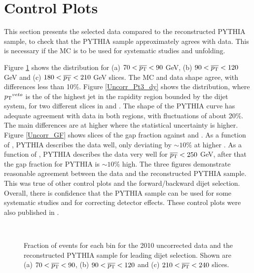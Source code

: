 \section{Control Plots}
\label{sec:GBJ1:Uncorr}
This section presents the selected data compared to the reconstructed PYTHIA sample, to check that the PYTHIA sample approximately agrees with data.
This is necessary if the MC is to be used for systematic studies and unfolding.


Figure \ref{UncorrIncl_dy} shows the \Incl{} distribution for (a) $70<\mbox{$\overline{p_{\rm T}}$}{}<90$ GeV, (b) $90<\mbox{$\overline{p_{\rm T}}$}{}<120$ GeV and (c) $180<\mbox{$\overline{p_{\rm T}}$}{}<210$ GeV slices. 
The MC and data shape agree, with differences less than 10\%.
Figure \ref{Uncorr_Pt3_dy} shows the \ptDist{} distribution, where $\mbox{$p_{\rm T}$}{}^{veto}$ is the \pt{} of the highest jet in the rapidity region bounded by the dijet system,  for two different slices in \dy{} and \ptb{}. 
The shape of the PYTHIA curve has adequate agreement with data in both regions, with fluctuations of about 20\%.
The main differences are at higher \pt{} where the statistical uncertainty is higher.
Figure \ref{Uncorr_GF} shows slices of the gap fraction against \dy{} and \ptb{}.
As a function of \dy{}, PYTHIA describes the data well, only deviating by $\sim10\%$ at higher \dy{}.
As a function of \ptb{}, PYTHIA describes the data very well for $\mbox{$\overline{p_{\rm T}}$}{}<250$ GeV, after that the gap fraction for PYTHIA is $\sim10\%$ high.
The three figures demonstrate reasonable agreement between the data and the reconstructed PYTHIA sample. 
This was true of other control plots and the forward/backward dijet selection.
Overall, there is confidence that the PYTHIA sample can be used for some systematic studies and for correcting detector effects. 
These control plots were also published in \cite{ref:ATLASGap}.

\begin{figure}
\centering
\mbox{
              \quad
              \quad
}
\mbox{
              \quad
                              }
\caption[Comparison of the inclusive distribution versus \dy{} between the data and the reconstructed PYTHIA sample for the leading \pt{} dijet selection]{
Fraction of events for each \dy{} bin for the 2010 uncorrected data and the reconstructed PYTHIA sample for leading \pt{} dijet selection. 
Shown are (a) $70<\mbox{$\overline{p_{\rm T}}$}{}<90$, (b) $90<\mbox{$\overline{p_{\rm T}}$}{}<120$ and (c) $210<\mbox{$\overline{p_{\rm T}}$}{}<240$ slices.
\label{UncorrIncl_dy}}
\end{figure}

